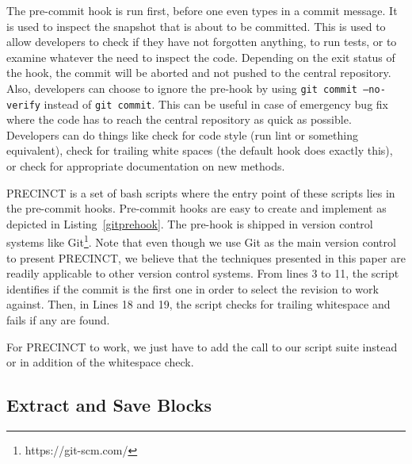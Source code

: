 \documentclass[conference]{IEEEtran}
\begin{document}
The pre-commit hook is run first, before one even types in a commit message. It is used to inspect the snapshot that is about to be committed.
This is used to allow developers to check if they have not forgotten anything, to run tests, or to examine whatever the need to inspect the code.
Depending on the exit status of the hook, the commit will be aborted and not pushed to the central repository.
Also, developers can choose to ignore the pre-hook by using \texttt{git commit --no-verify} instead of \texttt{git commit}.
This can be useful in case of emergency bug fix where the code has to reach the central repository as quick as possible.
Developers can do things like check for code style (run lint or something equivalent), check for trailing white spaces (the default hook does exactly this), or check for appropriate documentation on new methods.

PRECINCT is a set of bash scripts where the entry point of these scripts lies in the pre-commit hooks. Pre-commit hooks are easy to create and implement as depicted in Listing~\ref{gitprehook}.
The pre-hook is shipped in version control systems like Git\footnote{https://git-scm.com/}.
Note that even though we use Git as the main version control to present PRECINCT, we believe that the techniques presented in this paper are readily applicable to other version control systems.
From lines 3 to 11, the script identifies if the commit is the first one in order to select the revision to work against.
Then, in Lines 18 and 19, the script checks for trailing whitespace and fails if any are found.

\noindent\begin{minipage}{0.90\linewidth}

  

\end{minipage}

For PRECINCT to work, we just have to add the call to our script suite instead or in addition of the whitespace check.

\subsection{Extract and Save Blocks}
\label{sub:Extract and Save Blocks}
\end{document}
